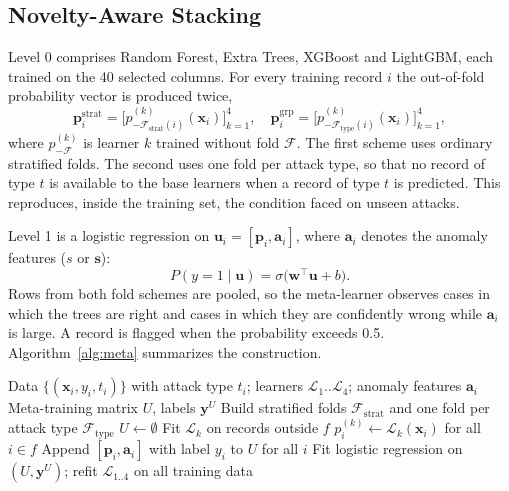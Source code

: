 \documentclass[journal]{IEEEtran}
\begin{document}
\subsection{Novelty-Aware Stacking}
\label{sec:stack}
Level 0 comprises Random Forest, Extra Trees, XGBoost and LightGBM, each trained on the 40 selected columns. For every training record $i$ the out-of-fold probability vector is produced twice,
\begin{equation}
\mathbf{p}^{\mathrm{strat}}_i=\bigl[p^{(k)}_{-\mathcal{F}_{\mathrm{strat}}(i)}(\mathbf{x}_i)\bigr]_{k=1}^{4},\quad
\mathbf{p}^{\mathrm{grp}}_i=\bigl[p^{(k)}_{-\mathcal{F}_{\mathrm{type}}(i)}(\mathbf{x}_i)\bigr]_{k=1}^{4},
\end{equation}
where $p^{(k)}_{-\mathcal{F}}$ is learner $k$ trained without fold $\mathcal{F}$. The first scheme uses ordinary stratified folds. The second uses one fold per attack type, so that no record of type $t$ is available to the base learners when a record of type $t$ is predicted. This reproduces, inside the training set, the condition faced on unseen attacks.

Level 1 is a logistic regression on $\mathbf{u}_i=[\mathbf{p}_i,\mathbf{a}_i]$, where $\mathbf{a}_i$ denotes the anomaly features ($s$ or $\mathbf{s}$):
\begin{equation}
P(y=1\mid\mathbf{u})=\sigma\bigl(\mathbf{w}^{\top}\mathbf{u}+b\bigr).
\end{equation}
Rows from both fold schemes are pooled, so the meta-learner observes cases in which the trees are right and cases in which they are confidently wrong while $\mathbf{a}_i$ is large. A record is flagged when the probability exceeds 0.5. Algorithm~\ref{alg:meta} summarizes the construction.

\begin{algorithm}[!t]
\caption{Novelty-aware meta-training set}
\label{alg:meta}
\begin{algorithmic}[1]
\Require Data $\{(\mathbf{x}_i,y_i,t_i)\}$ with attack type $t_i$; learners $\mathcal{L}_1..\mathcal{L}_4$; anomaly features $\mathbf{a}_i$
\Ensure Meta-training matrix $U$, labels $\mathbf{y}^U$
\State Build stratified folds $\mathcal{F}_{\mathrm{strat}}$ and one fold per attack type $\mathcal{F}_{\mathrm{type}}$
\State $U\gets\emptyset$
      \State Fit $\mathcal{L}_k$ on records outside $f$
      \State $p^{(k)}_i\gets\mathcal{L}_k(\mathbf{x}_i)$ for all $i\in f$
    \EndFor
  \EndFor
  \State Append $[\mathbf{p}_i,\mathbf{a}_i]$ with label $y_i$ to $U$ for all $i$
\EndFor
\State Fit logistic regression on $(U,\mathbf{y}^U)$; refit $\mathcal{L}_{1..4}$ on all training data
\end{algorithmic}
\end{algorithm}
\end{document}
